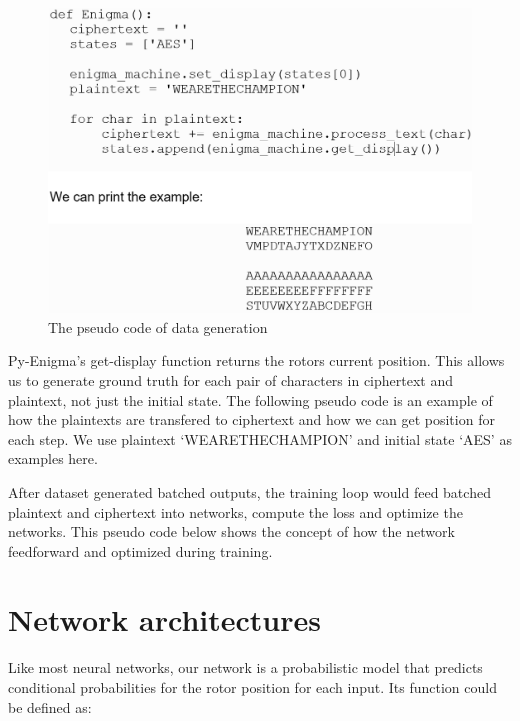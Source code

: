 \begin{figure}[hbt!]
    \centering
    \includegraphics[width=0.6\linewidth]{myReport//figures/Dataset_pseudo.png}
    \caption{The pseudo code of data generation}
    \label{fig:enter-label}
\end{figure}

Py-Enigma’s get-display function returns the rotors current position. This allows us to generate ground truth for each pair of characters in ciphertext and plaintext, not just the initial state. The following pseudo code is an example of how the plaintexts are transfered to ciphertext and how we can get position for each step. We use plaintext ‘WEARETHECHAMPION’ and initial state ‘AES’ as examples here.


After dataset generated batched outputs, the training loop would feed batched plaintext and ciphertext into networks, compute the loss and optimize the networks. This pseudo code below shows the concept of how the network feedforward and optimized during training.


\section{Network architectures}
Like most neural networks, our network is a probabilistic model that predicts conditional probabilities for the rotor position for each input. Its function could be defined as: 

